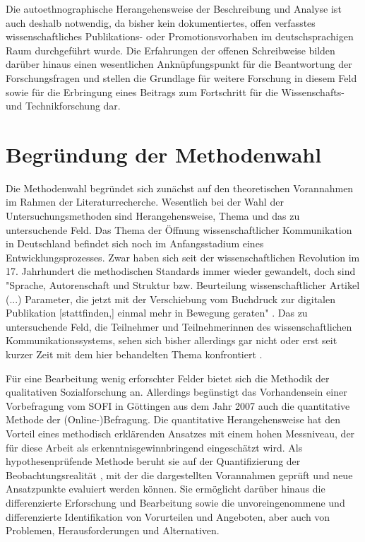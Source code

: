 Die autoethnographische Herangehensweise der Beschreibung und Analyse ist auch deshalb notwendig, da bisher kein dokumentiertes, offen verfasstes wissenschaftliches Publikations- oder Promotionsvorhaben im deutschsprachigen Raum durchgeführt wurde. Die Erfahrungen der offenen Schreibweise bilden darüber hinaus einen wesentlichen Anknüpfungspunkt für die Beantwortung der Forschungsfragen und stellen die Grundlage für weitere Forschung in diesem Feld sowie für die Erbringung eines Beitrags zum Fortschritt für die Wissenschafts- und Technikforschung dar.

\section{Begründung der Methodenwahl}

Die Methodenwahl begründet sich zunächst auf den theoretischen Vorannahmen im Rahmen der Literaturrecherche. Wesentlich bei der Wahl der Untersuchungsmethoden sind Herangehensweise, Thema und das zu untersuchende Feld. Das Thema der Öffnung wissenschaftlicher Kommunikation in Deutschland befindet sich noch im Anfangsstadium eines Entwicklungsprozesses. Zwar haben sich seit der wissenschaftlichen Revolution im 17. Jahrhundert die methodischen Standards immer wieder gewandelt, doch sind "Sprache, Autorenschaft und Struktur bzw. Beurteilung wissenschaftlicher Artikel (...) Parameter, die jetzt mit der Verschiebung vom Buchdruck zur digitalen Publikation [stattfinden,] einmal mehr in Bewegung geraten" \cite{hagner_2015_sache_buches}. Das zu untersuchende Feld, die Teilnehmer und Teilnehmerinnen des wissenschaftlichen Kommunikationssystems, sehen sich bisher allerdings gar nicht oder erst seit kurzer Zeit mit dem hier behandelten Thema konfrontiert \cite{hagner_2015_sache_buches}.

Für eine Bearbeitung wenig erforschter Felder bietet sich die Methodik der qualitativen Sozialforschung an. Allerdings begünstigt das Vorhandensein einer Vorbefragung vom SOFI in Göttingen aus dem Jahr 2007 auch die quantitative Methode der (Online-)Befragung. Die quantitative Herangehensweise hat den Vorteil eines methodisch erklärenden Ansatzes mit einem hohen Messniveau, der für diese Arbeit als erkenntnisgewinnbringend eingeschätzt wird. Als hypothesenprüfende Methode beruht sie auf der Quantifizierung der Beobachtungsrealität \cite{bortz_Doering_2006_Methoden}, mit der die dargestellten Vorannahmen geprüft und neue Ansatzpunkte evaluiert werden können. Sie ermöglicht darüber hinaus die differenzierte Erforschung und Bearbeitung sowie die unvoreingenommene und differenzierte Identifikation von Vorurteilen und Angeboten, aber auch von Problemen, Herausforderungen und Alternativen.

